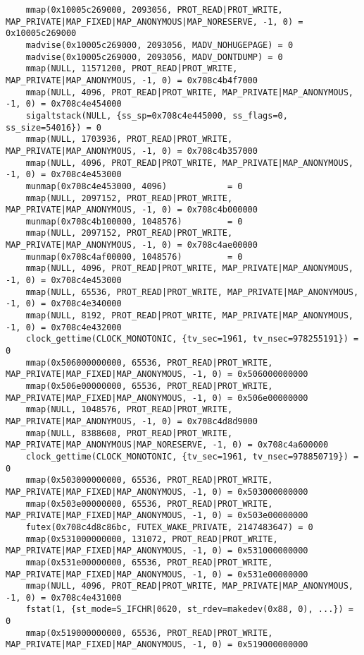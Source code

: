 \documentclass[12pt]{article}
\begin{document}
\begin{verbatim}
	mmap(0x10005c269000, 2093056, PROT_READ|PROT_WRITE, MAP_PRIVATE|MAP_FIXED|MAP_ANONYMOUS|MAP_NORESERVE, -1, 0) = 0x10005c269000
	madvise(0x10005c269000, 2093056, MADV_NOHUGEPAGE) = 0
	madvise(0x10005c269000, 2093056, MADV_DONTDUMP) = 0
	mmap(NULL, 11571200, PROT_READ|PROT_WRITE, MAP_PRIVATE|MAP_ANONYMOUS, -1, 0) = 0x708c4b4f7000
	mmap(NULL, 4096, PROT_READ|PROT_WRITE, MAP_PRIVATE|MAP_ANONYMOUS, -1, 0) = 0x708c4e454000
	sigaltstack(NULL, {ss_sp=0x708c4e445000, ss_flags=0, ss_size=54016}) = 0
	mmap(NULL, 1703936, PROT_READ|PROT_WRITE, MAP_PRIVATE|MAP_ANONYMOUS, -1, 0) = 0x708c4b357000
	mmap(NULL, 4096, PROT_READ|PROT_WRITE, MAP_PRIVATE|MAP_ANONYMOUS, -1, 0) = 0x708c4e453000
	munmap(0x708c4e453000, 4096)            = 0
	mmap(NULL, 2097152, PROT_READ|PROT_WRITE, MAP_PRIVATE|MAP_ANONYMOUS, -1, 0) = 0x708c4b000000
	munmap(0x708c4b100000, 1048576)         = 0
	mmap(NULL, 2097152, PROT_READ|PROT_WRITE, MAP_PRIVATE|MAP_ANONYMOUS, -1, 0) = 0x708c4ae00000
	munmap(0x708c4af00000, 1048576)         = 0
	mmap(NULL, 4096, PROT_READ|PROT_WRITE, MAP_PRIVATE|MAP_ANONYMOUS, -1, 0) = 0x708c4e453000
	mmap(NULL, 65536, PROT_READ|PROT_WRITE, MAP_PRIVATE|MAP_ANONYMOUS, -1, 0) = 0x708c4e340000
	mmap(NULL, 8192, PROT_READ|PROT_WRITE, MAP_PRIVATE|MAP_ANONYMOUS, -1, 0) = 0x708c4e432000
	clock_gettime(CLOCK_MONOTONIC, {tv_sec=1961, tv_nsec=978255191}) = 0
	mmap(0x506000000000, 65536, PROT_READ|PROT_WRITE, MAP_PRIVATE|MAP_FIXED|MAP_ANONYMOUS, -1, 0) = 0x506000000000
	mmap(0x506e00000000, 65536, PROT_READ|PROT_WRITE, MAP_PRIVATE|MAP_FIXED|MAP_ANONYMOUS, -1, 0) = 0x506e00000000
	mmap(NULL, 1048576, PROT_READ|PROT_WRITE, MAP_PRIVATE|MAP_ANONYMOUS, -1, 0) = 0x708c4d8d9000
	mmap(NULL, 8388608, PROT_READ|PROT_WRITE, MAP_PRIVATE|MAP_ANONYMOUS|MAP_NORESERVE, -1, 0) = 0x708c4a600000
	clock_gettime(CLOCK_MONOTONIC, {tv_sec=1961, tv_nsec=978850719}) = 0
	mmap(0x503000000000, 65536, PROT_READ|PROT_WRITE, MAP_PRIVATE|MAP_FIXED|MAP_ANONYMOUS, -1, 0) = 0x503000000000
	mmap(0x503e00000000, 65536, PROT_READ|PROT_WRITE, MAP_PRIVATE|MAP_FIXED|MAP_ANONYMOUS, -1, 0) = 0x503e00000000
	futex(0x708c4d8c86bc, FUTEX_WAKE_PRIVATE, 2147483647) = 0
	mmap(0x531000000000, 131072, PROT_READ|PROT_WRITE, MAP_PRIVATE|MAP_FIXED|MAP_ANONYMOUS, -1, 0) = 0x531000000000
	mmap(0x531e00000000, 65536, PROT_READ|PROT_WRITE, MAP_PRIVATE|MAP_FIXED|MAP_ANONYMOUS, -1, 0) = 0x531e00000000
	mmap(NULL, 4096, PROT_READ|PROT_WRITE, MAP_PRIVATE|MAP_ANONYMOUS, -1, 0) = 0x708c4e431000
	fstat(1, {st_mode=S_IFCHR|0620, st_rdev=makedev(0x88, 0), ...}) = 0
	mmap(0x519000000000, 65536, PROT_READ|PROT_WRITE, MAP_PRIVATE|MAP_FIXED|MAP_ANONYMOUS, -1, 0) = 0x519000000000

\end{verbatim}
\end{document}
